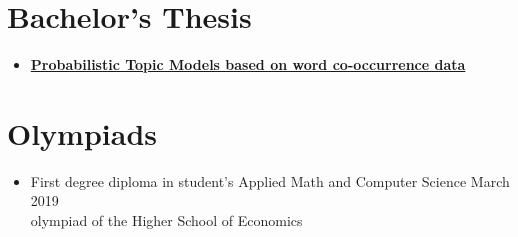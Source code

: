 \documentclass[letterpaper,11pt]{article}
\newcommand{\resumeSubHeadingListStart}{\begin{itemize}[leftmargin=*]}
\newcommand{\resumeSubHeadingListEnd}{\end{itemize}}
\begin{document}
\vspace{-23pt}
\section{Bachelor's Thesis}
  \resumeSubHeadingListStart
      \item{
    \textbf{\href{http://www.machinelearning.ru/wiki/images/f/f2/Solotkiy19bsc.pdf}{\color{blue} Probabilistic Topic Models based on word co-occurrence data}}
    }
  \resumeSubHeadingListEnd

\vspace{-23pt}
\section{Olympiads}
  \resumeSubHeadingListStart
      \item{
    		First degree diploma in student's Applied Math and Computer Science
    		\hfill
        March 2019 \\
        olympiad of the Higher School of Economics
      }
  \resumeSubHeadingListEnd

\end{document}
